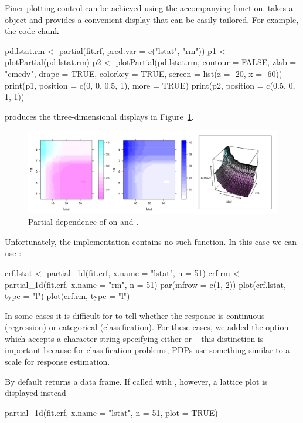 Finer plotting control can be achieved using the accompanying  function.  takes a  object and provides a convenient  display that can be easily tailored. For example, the code chunk
\begin{example}
pd.lstat.rm <- partial(fit.rf, pred.var = c("lstat", "rm"))
p1 <- plotPartial(pd.lstat.rm)
p2 <- plotPartial(pd.lstat.rm, contour = FALSE, zlab = "cmedv", drape = TRUE, 
                  colorkey = TRUE, screen = list(z = -20, x = -60))
print(p1, position = c(0, 0, 0.5, 1), more = TRUE)
print(p2, position = c(0.5, 0, 1, 1))
\end{example}
produces the three-dimensional displays in Figure~\ref{fig:pd_lstat_rm}.
\begin{figure}[htbp]
  \centering
  \includegraphics[width=1.0\linewidth]{pd_lstat_rm}
  \caption{Partial dependence of  on  and .}
  \label{fig:pd_lstat_rm}
\end{figure}

Unfortunately, the  implementation contains no such function. In this case we can use :
\begin{example}
crf.lstat <- partial_1d(fit.crf, x.name = "lstat", n = 51)
crf.rm <- partial_1d(fit.crf, x.name = "rm", n = 51)
par(mfrow = c(1, 2))
plot(crf.lstat, type = "l")
plot(crf.rm, type = "l")
\end{example}

In some cases it is difficult for  to tell whether the response is continuous (regression) or categorical (classification). For these cases, we added the option  which accepts a character string specifying either  or  -- this distinction is important because for classification problems, PDPs use something similar to a  scale for response estimation.

By default  returns a data frame. If called with , however, a lattice plot is displayed instead
\begin{example}
partial_1d(fit.crf, x.name = "lstat", n = 51, plot = TRUE)
\end{example}

